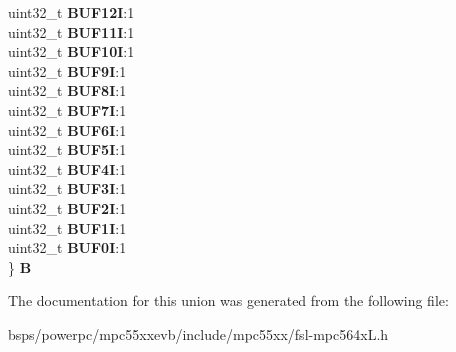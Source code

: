 \begin{DoxyCompactItemize}
\begin{tabbing}
\>uint32\_t {\bfseries BUF12I}:1\\
\>uint32\_t {\bfseries BUF11I}:1\\
\>uint32\_t {\bfseries BUF10I}:1\\
\>uint32\_t {\bfseries BUF9I}:1\\
\>uint32\_t {\bfseries BUF8I}:1\\
\>uint32\_t {\bfseries BUF7I}:1\\
\>uint32\_t {\bfseries BUF6I}:1\\
\>uint32\_t {\bfseries BUF5I}:1\\
\>uint32\_t {\bfseries BUF4I}:1\\
\>uint32\_t {\bfseries BUF3I}:1\\
\>uint32\_t {\bfseries BUF2I}:1\\
\>uint32\_t {\bfseries BUF1I}:1\\
\>uint32\_t {\bfseries BUF0I}:1\\
\} {\bfseries B}\\

\end{tabbing}\end{DoxyCompactItemize}


The documentation for this union was generated from the following file\+:\begin{DoxyCompactItemize}
\item 
bsps/powerpc/mpc55xxevb/include/mpc55xx/fsl-\/mpc564x\+L.\+h\end{DoxyCompactItemize}
